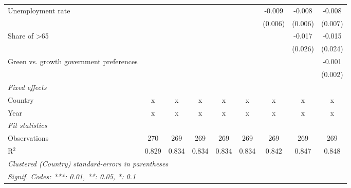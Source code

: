 \begin{table}[htbp]
\begin{tabular}{lcccccccc}
      Unemployment rate                                                 &         &         &         &         &         & -0.009  & -0.008  & -0.008\\   
                                                                        &         &         &         &         &         & (0.006) & (0.006) & (0.007)\\   
      Share of >65                                                      &         &         &         &         &         &         & -0.017  & -0.015\\   
                                                                        &         &         &         &         &         &         & (0.026) & (0.024)\\   
      Green vs. growth government preferences                           &         &         &         &         &         &         &         & -0.001\\   
                                                                        &         &         &         &         &         &         &         & (0.002)\\   
      \emph{Fixed effects}\\
      Country                                                           & x       & x       & x       & x       & x       & x       & x       & x\\  
      Year                                                              & x       & x       & x       & x       & x       & x       & x       & x\\  
      \midrule \emph{Fit statistics}\\
      Observations                                                      & 270     & 269     & 269     & 269     & 269     & 269     & 269     & 269\\  
      R$^2$                                                             & 0.829   & 0.834   & 0.834   & 0.834   & 0.834   & 0.842   & 0.847   & 0.848\\  
      \midrule
      \multicolumn{9}{l}{\emph{Clustered (Country) standard-errors in parentheses}}\\
      \multicolumn{9}{l}{\emph{Signif. Codes: ***: 0.01, **: 0.05, *: 0.1}}\\
   \end{tabular}
\end{table}


